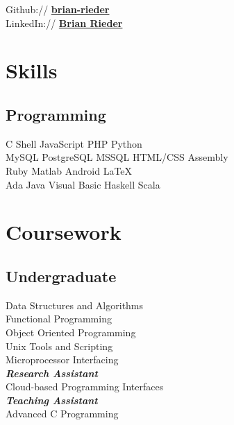 \documentclass[letterpaper]{deedy-resume} %
\begin{document}
\begin{minipage}[t]{0.33\textwidth}
Github:// \href{https://github.com/brian-rieder}{\bf brian-rieder} \\
LinkedIn:// \href{https://www.linkedin.com/in/debarghyadas}{\bf Brian Rieder} 

\sectionspace %


\section{Skills}

\subsection{Programming}

C \textbullet{} Shell \textbullet{} JavaScript \textbullet{} PHP \textbullet{} Python \\
MySQL \textbullet{} PostgreSQL \textbullet{} MSSQL HTML/CSS \textbullet{} Assembly \\
Ruby \textbullet{} Matlab \textbullet{} Android \textbullet{} \LaTeX\ \\
Ada \textbullet{} Java \textbullet{} Visual Basic \textbullet{} Haskell \textbullet{} Scala

\sectionspace %


\section{Coursework}

\subsection{Undergraduate}

Data Structures and Algorithms \\
Functional Programming \\
Object Oriented Programming \\
Unix Tools and Scripting \\
Microprocessor Interfacing \\
{\footnotesize \textit{\textbf{Research Assistant}}} \\
Cloud-based Programming Interfaces \\
{\footnotesize \textit{\textbf{Teaching Assistant}}} \\
Advanced C Programming


\end{minipage}
\end{document}

